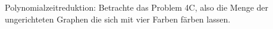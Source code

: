 \documentclass[10pt, a4paper]{exam}
\begin{document}
\begin{questions}
\begin{solution}
  \end{solution}

  \question Polynomialzeitreduktion: Betrachte das Problem 4C, also die Menge der ungerichteten Graphen die sich mit vier Farben färben lassen.
\end{questions}
\end{document}

